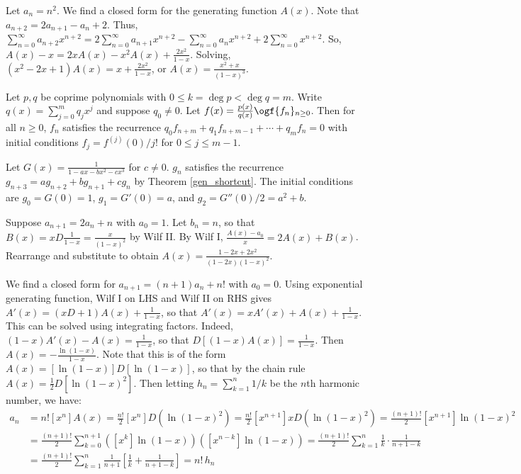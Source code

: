 \documentclass[a4paper]{article}
\begin{document}
\begin{example}\label{nsqgen}
Let $a_n=n^2$. We find a closed form for the generating function $A(x)$. Note that $a_{n+2}=2a_{n+1}-a_{n}+2$. Thus, $\sum_{n=0}^\infty a_{n+2}x^{n+2}=2\sum_{n=0}^\infty a_{n+1}x^{n+2}-\sum_{n=0}^\infty a_nx^{n+2}+2\sum_{n=0}^\infty x^{n+2}$. So, $A(x)-x=2xA(x)-x^2A(x)+\frac{2x^2}{1-x}$. Solving, $(x^2-2x+1)A(x)=x+\frac{2x^2}{1-x}$, or $A(x)=\frac{x^2+x}{(1-x)^3}$.
\end{example}

\begin{theorem}\label{gen_shortcut}
Let $p,q$ be coprime polynomials with $0\leq k=\deg p<\deg q=m$. Write $q(x)=\sum_{j=0}^mq_jx^j$ and suppose $q_0\neq0$. Let $f(x)=\frac{p(x)}{q(x)}\ogf \{f_n\}_{n\geq0}$. Then for all $n\geq0$, $f_n$ satisfies the recurrence $q_0f_{n+m}+q_1f_{n+m-1}+\cdots+q_mf_n=0$ with initial conditions $f_j=f^{(j)}(0)/j!$ for $0\leq j\leq m-1$.
\end{theorem}

\begin{example}
Let $G(x)=\frac1{1-ax-bx^2-cx^3}$ for $c\neq0$. $g_n$ satisfies the recurrence $g_{n+3}=ag_{n+2}+bg_{n+1}+cg_n$ by Theorem \ref{gen_shortcut}. The initial conditions are $g_0=G(0)=1$, $g_1=G'(0)=a$, and $g_2=G''(0)/2=a^2+b$.
\end{example}

\begin{example}
Suppose $a_{n+1}=2a_n+n$ with $a_0=1$. Let $b_n=n$, so that $\displaystyle B(x)=xD\frac1{1-x}=\frac x{(1-x)^2}$ by Wilf II. By Wilf I, $\frac{A(x)-a_0}x=2A(x)+B(x)$. Rearrange and substitute to obtain $A(x)=\frac{1-2x+2x^2}{(1-2x)(1-x)^2}$.
\end{example}

\begin{example}
We find a closed form for $a_{n+1}=(n+1)a_n+n!$ with $a_0=0$. Using exponential generating function, Wilf I on LHS and Wilf II on RHS gives $A'(x)=(xD+1)A(x)+\frac1{1-x}$, so that $A'(x)=xA'(x)+A(x)+\frac1{1-x}$. This can be solved using integrating factors. Indeed, $(1-x)A'(x)-A(x)=\frac1{1-x}$, so that $D[(1-x)A(x)]=\frac1{1-x}$. Then $A(x)=-\frac{\ln(1-x)}{1-x}$. Note that this is of the form $A(x)=[\ln(1-x)]D[\ln(1-x)]$, so that by the chain rule $A(x)=\frac12D[\ln(1-x)^2]$. Then letting $h_n=\sum_{k=1}^n1/k$ be the $n$th harmonic number, we have:
\begin{align*}
a_n
&=n![x^n]A(x)
=\frac{n!}2[x^n]D(\ln(1-x)^2)
=\frac{n!}2[x^{n+1}]xD(\ln(1-x)^2)
=\frac{(n+1)!}2[x^{n+1}]\ln(1-x)^2\\
&=\frac{(n+1)!}2\sum_{k=0}^{n+1}([x^k]\ln(1-x))([x^{n-k}]\ln(1-x))
=\frac{(n+1)!}2\sum_{k=1}^{n}\frac1k\cdot\frac1{n+1-k}\\
&=\frac{(n+1)!}2\sum_{k=1}^n\frac1{n+1}\left[\frac1k+\frac1{n+1-k}\right]
=n!\,h_n
\end{align*}
\end{example}
\end{document}
